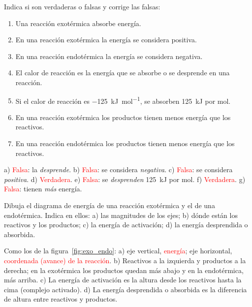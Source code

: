 \begin{exercise}
    Indica si son verdaderas o falsas y corrige las falsas:
    \begin{enumerate}[label=\alph*)]
        \item Una reacción exotérmica absorbe energía.
        \item En una reacción exotérmica la energía se considera positiva.
        \item En una reacción endotérmica la energía se considera negativa.
        \item El calor de reacción es la energía que se absorbe o se desprende en una reacción.
        \item Si el calor de reacción es \qty{-125}{\kilo\joule\per\mol}, se absorben \qty{125}{\kilo\joule} por mol.
        \item En una reacción exotérmica los productos tienen menos energía que los reactivos.
        \item En una reacción endotérmica los productos tienen menos energía que los reactivos.
    \end{enumerate}
    \begin{solu}
        a) \textcolor{red}{Falsa}: la \emph{desprende}. b) \textcolor{red}{Falsa}: se considera \emph{negativa}. c) \textcolor{red}{Falsa}: se considera \emph{positiva}. d) \textcolor{red}{Verdadera}. e) \textcolor{red}{Falsa}: se \emph{desprenden} \qty{125}{\kilo\joule} por mol. f) \textcolor{red}{Verdadera}. g) \textcolor{red}{Falsa}: tienen \emph{más} energía.
    \end{solu}
\end{exercise}

\begin{exercise}
    Dibuja el diagrama de energía de una reacción exotérmica y el de una endotérmica. Indica en ellos: a) las magnitudes de los ejes; b) dónde están los reactivos y los productos; c) la energía de activación; d) la energía desprendida o absorbida.
    \begin{solu}
        Como los de la figura~\ref{fig:exo_endo}: a) eje vertical, \textcolor{red}{energía}; eje horizontal, \textcolor{red}{coordenada (avance) de la reacción}. b) Reactivos a la izquierda y productos a la derecha; en la exotérmica los productos quedan más abajo y en la endotérmica, más arriba. c) La energía de activación es la altura desde los reactivos hasta la cima (complejo activado). d) La energía desprendida o absorbida es la diferencia de altura entre reactivos y productos.
    \end{solu}
\end{exercise}

